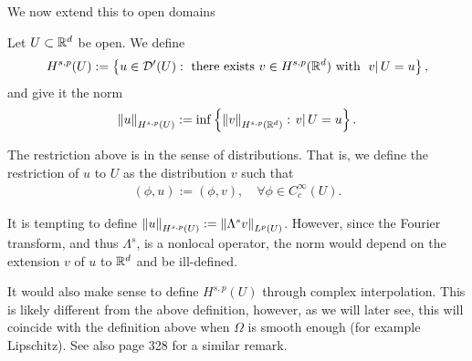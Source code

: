 \documentclass[
    a4paper,
    DIV=14,
    abstract=true,
    numbers=noenddot
]{scrartcl}
\begin{document}
We now extend this to open domains
\begin{definition}\label{bessel potential def Omega}
    Let $U  \subset \mathbb{R}^d$ be open. We define
    \begin{align*}
        H^{s,p}(U ):=\left\{u \in \mathcal{D}^{\prime}(U ): \text{ there exists } v \in H^{s,p}(\mathbb{R}^d) \text{ with } \left.v\right|{U }=u\right\},
    \end{align*}
    and give it the norm
    \begin{align*}
        \left\lVert u \right\rVert_{H^{s,p}(U )}:= \inf \left\{\left\lVert v \right\rVert_{H^{s,p}(\mathbb{R}^d)}: \left.v\right|{U }=u\right\}.
    \end{align*}
\end{definition}
The restriction above is in the sense of distributions. That is, we define the restriction of $u$ to $U$ as the distribution $v$ such that
\begin{align*}
    (\phi,u):=(\phi,v), \quad \forall \phi \in C_c^\infty(U ).
\end{align*}
\begin{observation}
    It is tempting to define $\left\lVert u \right\rVert_{H^{s,p}(U )}:=\left\lVert \Lambda^s v \right\rVert_{L^p(U )}$. However, since the Fourier transform, and thus $\Lambda^s$, is a nonlocal operator, the norm would depend on the extension $v$  of $u$ to $\mathbb{R}^d$ and be ill-defined.
\end{observation}
\begin{observation}
    It would also make sense to define $H^{s,p}(U )$  through complex interpolation. This is likely different from the above definition, however, as we will later see, this will coincide with the definition above when $\Omega $ is smooth enough (for example Lipschitz). See also \cite{leoni2023first} page 328 for a similar remark.
\end{observation}
\end{document}
